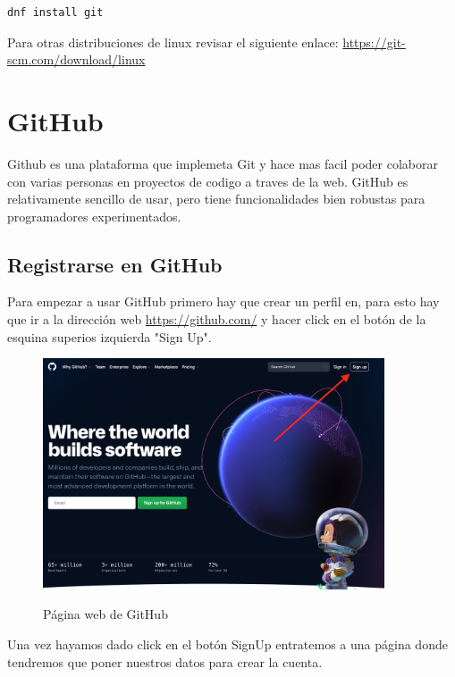 \documentclass[11pt, oneside]{article}
\begin{document}
\begin{lstlisting}[language=bash,caption={Comando para instalar git en Fedora22 y superiores}]
dnf install git
\end{lstlisting}

Para otras distribuciones de linux revisar el siguiente enlace: \url{https://git-scm.com/download/linux}

\section{GitHub}
Github es una plataforma que implemeta Git y hace mas facil poder colaborar con varias personas en proyectos de codigo a traves de la web. GitHub es relativamente sencillo de usar, pero tiene funcionalidades bien robustas para programadores experimentados. 

\subsection{Registrarse en GitHub}
Para empezar a usar GitHub primero hay que crear un perfil en, para esto hay que ir a la dirección web \url{https://github.com/} y hacer click en el botón de la esquina superios izquierda "Sign Up".

\begin{figure}[H]
  \centering
  \caption{Página web de GitHub}
  \includegraphics[width=0.90\textwidth]{./img/github-signup-1.png}
  \label{fig:github-signup-1}
\end{figure}

Una vez hayamos dado click en el botón SignUp entratemos a una página donde tendremos que poner nuestros datos para crear la cuenta.
\end{document}
